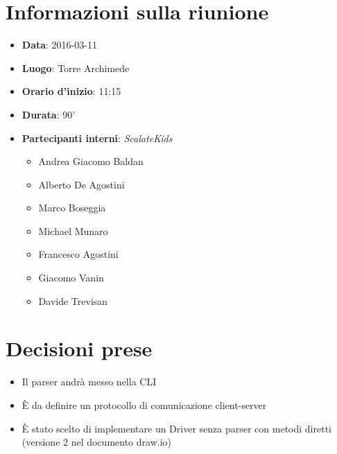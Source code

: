 \documentclass{scalatekids-article}
\begin{document}
\section{Informazioni sulla riunione}
\begin{itemize}
\item \textbf{Data}: 2016-03-11
\item \textbf{Luogo}: Torre Archimede
\item \textbf{Orario d'inizio}: 11:15
\item \textbf{Durata}: 90'
\item \textbf{Partecipanti interni}: \textit{ScalateKids}
  \begin{itemize}
  \item Andrea Giacomo Baldan
  \item Alberto De Agostini
  \item Marco Boseggia
  \item Michael Munaro
  \item Francesco Agostini
  \item Giacomo Vanin
  \item Davide Trevisan
  \end{itemize}
\end{itemize}
\section{Decisioni prese}
\begin{itemize}
  \item Il parser andrà messo nella CLI
  \item È da definire un protocollo di comunicazione client-server
  \item È stato scelto di implementare un Driver senza parser con metodi diretti (versione 2 nel documento draw.io)%
\end{itemize}
\end{document}
